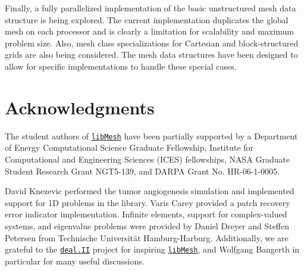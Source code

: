 \documentclass[global,twocolumn,final]{svjour}
\newcommand{\libMesh}{\href{http://libmesh.sourceforge.net}{\texttt{lib\-Mesh}}}
\newcommand{\dealII}{\href{http://www.dealii.org}{\texttt{deal.\-II}}}
\begin{document}
Finally, a fully parallelized implementation of the basic unstructured
mesh data structure is being explored.  The current implementation
duplicates the global mesh on each processor and is clearly a
limitation for scalability and maximum problem size.  Also, mesh class
specializations for Cartesian and block-structured grids are also
being considered.  The mesh data structures have been designed to
allow for specific implementations to handle these special cases.

\section{Acknowledgments}
The student authors of \libMesh{} have been partially supported by a
Department of Energy Computational Science Graduate Fellowship,
Institute for Computational and Engineering Sciences (ICES)
fellowships, N\-A\-SA Graduate Student Research Grant NGT5-139, and
DARPA Grant No. HR-06-1-0005.

David Knezevic performed the tumor angiogenesis simulation and
implemented support for 1D problems in the library.  Varis Carey
provided a patch recovery error indicator implementation.  Infinite
elements, support for complex-valued systems, and eigenvalue problems
were provided by Daniel Dreyer and Steffen Petersen from Technische
Universit\"{a}t Hamburg-Harburg.  Additionally, we are grateful to the
\dealII{} project for inspiring \libMesh{}, and Wolfgang Bangerth in
particular for many useful discussions.

%
%
%

\end{document}
